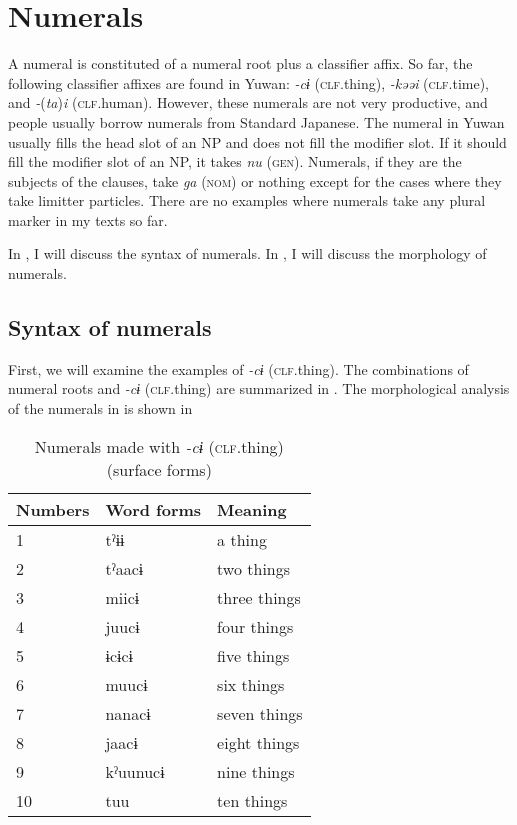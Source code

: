 \z

\section{Numerals}

A numeral is constituted of a numeral root plus a classifier affix. So far, the following classifier affixes are found in Yuwan: \textit{{}-cɨ} (\textsc{clf}.thing), \textit{{}-kəəi} (\textsc{clf}.time), and \textit{{}-}(\textit{ta})\textit{i} (\textsc{clf}.human). However, these numerals are not very productive, and people usually borrow numerals from Standard Japanese. The numeral in Yuwan usually fills the head slot of an NP and does not fill the modifier slot. If it should fill the modifier slot of an NP, it takes \textit{nu} (\textsc{gen}). Numerals, if they are the subjects of the clauses, take \textit{ga} (\textsc{nom}) or nothing except for the cases where they take limitter particles. There are no examples where numerals take any plural marker in my texts so far.

  In , I will discuss the syntax of numerals. In , I will discuss the morphology of numerals.

\subsection{Syntax of numerals}

First, we will examine the examples of \textit{{}-cɨ} (\textsc{clf}.thing). The combinations of numeral roots and \textit{{}-cɨ} (\textsc{clf}.thing) are summarized in . The morphological analysis of the numerals in  is shown in 

\begin{table}
\caption{\label{tab:key:47} Numerals made with \textit{-cɨ} (\textsc{clf}.thing) (surface forms)}

\begin{tabular}{lll}
\lsptoprule
Numbers  & Word forms  & Meaning\\
\midrule
1 & tˀɨɨ  &a thing\\
2 & tˀaacɨ&  two things     \\
3 & miicɨ & three things    \\
4 & juucɨ & four things     \\
5 & ɨcɨcɨ & five things     \\
6 & muucɨ & six things      \\
7 & nanacɨ&  seven things   \\
8 & jaacɨ & eight things    \\
9 & kˀuunucɨ & nine things  \\
10&  tuu    & ten things    \\
\end{tabular}
\end{table}

